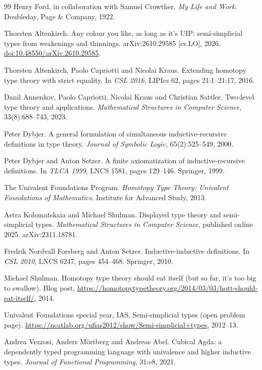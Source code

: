\documentclass[11pt]{article}
\begin{document}
\begin{thebibliography}{99}
Henry Ford, in collaboration with Samuel Crowther.
\newblock \emph{My Life and Work}.
\newblock Doubleday, Page \& Company, 1922.

Thorsten Altenkirch.
\newblock Any colour you like, as long as it's UIP: semi-simplicial types from
  weakenings and thinnings.
\newblock arXiv:2610.29585 [cs.LO], 2026.
  \href{https://doi.org/10.48550/arXiv.2610.29585}{doi:10.48550/arXiv.2610.29585}.

Thorsten Altenkirch, Paolo Capriotti and Nicolai Kraus.
\newblock Extending homotopy type theory with strict equality.
\newblock In \emph{CSL 2016}, LIPIcs 62, pages 21:1--21:17, 2016.

Danil Annenkov, Paolo Capriotti, Nicolai Kraus and Christian Sattler.
\newblock Two-level type theory and applications.
\newblock \emph{Mathematical Structures in Computer Science}, 33(8):688--743,
  2023.

Peter Dybjer.
\newblock A general formulation of simultaneous inductive-recursive
  definitions in type theory.
\newblock \emph{Journal of Symbolic Logic}, 65(2):525--549, 2000.

Peter Dybjer and Anton Setzer.
\newblock A finite axiomatization of inductive-recursive definitions.
\newblock In \emph{TLCA 1999}, LNCS 1581, pages 129--146. Springer, 1999.

The Univalent Foundations Program.
\newblock \emph{Homotopy Type Theory: Univalent Foundations of Mathematics}.
\newblock Institute for Advanced Study, 2013.

Astra Kolomatskaia and Michael Shulman.
\newblock Displayed type theory and semi-simplicial types.
\newblock \emph{Mathematical Structures in Computer Science}, published online
  2025. arXiv:2311.18781.

Fredrik Nordvall Forsberg and Anton Setzer.
\newblock Inductive-inductive definitions.
\newblock In \emph{CSL 2010}, LNCS 6247, pages 454--468. Springer, 2010.

Michael Shulman.
\newblock Homotopy type theory should eat itself (but so far, it's too big to
  swallow).
\newblock Blog post, \url{https://homotopytypetheory.org/2014/03/03/hott-should-eat-itself/},
  2014.

Univalent Foundations special year, IAS.
\newblock Semi-simplicial types (open problem page).
\newblock \url{https://ncatlab.org/ufias2012/show/Semi-simplicial+types},
  2012--13.

Andrea Vezzosi, Anders Mörtberg and Andreas Abel.
\newblock Cubical Agda: a dependently typed programming language with
  univalence and higher inductive types.
\newblock \emph{Journal of Functional Programming}, 31:e8, 2021.
\end{thebibliography}
\end{document}
